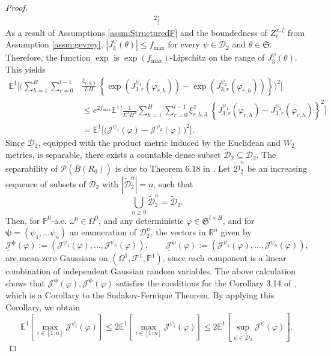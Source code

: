 \documentclass{article}
\newcommand{\R}{\mathbb{R}}
\newcommand{\E}{\mathbb{E}}
\begin{document}
\begin{appendices}
\begin{proof}
\begin{align*}
^2\Bigg]
\end{align*}
As a result of Assumptions \ref{assm:StructuredF} and the boundedness of $Z^{x,\zeta}_t$ from Assumption \ref{assm:gevrey}, $|J^\psi_3(\theta)|\le f_{\mathrm{max}}$ for every $\psi\in \mathscr{D}_2$ and $\theta\in \mathfrak{S}$. Therefore, the function $\exp$ is $\exp(f_\mathrm{max})$-Lipschitz on the range of $J^\psi_3(\theta)$. This yields
\begin{align*}
\mathbb E^1\Bigg[\bigg(\sum_{h=1}^H\sum_{r=0}^{l-1}&\frac{\xi_{r,h,3}}{LH}\;\left\{ \exp\left( J^{\psi_1}_{3,r}(\varphi_{r,h})\right)- \exp\left( J^{\psi_2}_{3,r}(\varphi_{r,h})\right)\right\}
\bigg)^2\Bigg]
    \\& \le e^{2f_{\mathrm{max}}}\mathbb E^1\Bigg[\frac{1}{L^2H^2}\sum_{h=1}^H\sum_{r=0}^{l-1}\xi^2_{r,h,3}\;\left\{J^{\psi_1}_{3,r}(\varphi_{r,h})-J^{\psi_2}_{3,r}(\varphi_{r,h})\right\}
^2\Bigg]\\
& = \mathbb E^1\Bigg[\bigg( \mathscr{J}^{\psi_1}(\varphi)-\mathscr{J}^{\psi_2}(\varphi)\bigg)
^2\Bigg].
\end{align*}
Since $\mathscr{D}_2$, equipped with the product metric induced by the Euclidean and $W_2$ metrics, is separable, there exists a countable dense subset $\widetilde{\mathscr{D}}_2\subseteq \mathscr{D}_2$. The separability of $\mathcal P(\bar B(R_0))$ is due to Theorem 6.18 in \cite{villani2008optimal}. Let $\widetilde{\mathscr{D}}^n_2$ be an increasing sequence of subsets of $\mathscr{D}_2$ with $|\widetilde{\mathscr{D}}^n_2|=n$, such that
\[
\bigcup_{n\ge 0}\widetilde{\mathscr{D}}^n_2= \widetilde{\mathscr{D}}_2.
\]
Then, for $\mathbb P^0$-a.e. $\omega^0\in \Omega^0$, and any deterministic $\varphi\in \mathfrak{S}^{l\times H}$, and for $\bm\psi=(\psi_1,\ldots\psi_n)$ an enumeration of $\mathscr{D}^n_2$, the vectors in $\R^n$ given by
\[
\underline{\mathcal J}^{\bm{\psi}}(\varphi):=(\mathcal J^{\psi_1}(\varphi),\ldots,\mathcal J^{\psi_n}(\varphi)),\qquad \underline{\mathscr{J}}^{\bm{\psi}}(\varphi):= (\mathscr J^{\psi_1}(\varphi),\ldots,\mathscr J^{\psi_n}(\varphi)),
\]
are mean-zero Gaussians on $(\Omega^1,\mathcal F^1,\mathbb P^1)$, since each component is a linear combination of independent Gaussian random variables. The above calculation shows that $\underline{\mathcal J}^{\bm{\psi}}(\varphi), \underline{\mathscr J}^{\bm{\psi}}(\varphi)$ satisfies the conditions for the Corollary 3.14 of \cite{Ledoux1991}, which is a Corollary to the Sudakov-Fernique Theorem. By applying this Corollary, we obtain
\[
\E^1\left[\max_{i\in[1:n]}\mathcal J^{\psi_i}(\varphi)\right]\le2 \E^1\left[ \max_{i\in[1:n]}\mathscr J^{\psi_i}(\varphi)\right]\le 2\E^1\left[\sup_{\psi\in \widetilde{\mathscr{D}}_2}\mathscr J^{\psi}(\varphi)\right].
\]
\end{proof}
\end{appendices}
\end{document}
